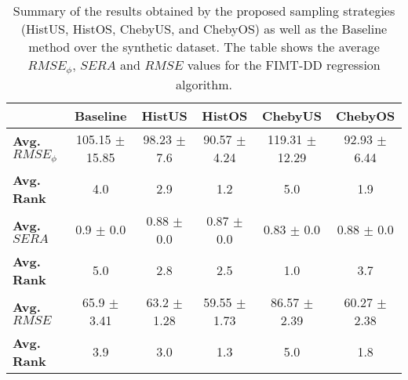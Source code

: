 \begin{table}[!htb]
\caption{Summary of the results obtained by the proposed sampling strategies (HistUS, HistOS, ChebyUS, and
ChebyOS) as well as the Baseline method over the synthetic dataset. The table shows the average
$RMSE_{\phi}$, $SERA$ and $RMSE$ values for the FIMT-DD regression algorithm.}
\label{tab:result_phi_sera_synthetic}
\begin{tabular*}{\textwidth}{@{\extracolsep{\fill}}lccccc}
\toprule
 & Baseline & HistUS & HistOS & ChebyUS & ChebyOS \\
\midrule
{\bf Avg. $RMSE_{\phi}$} & 105.15 $\pm$ 15.85 & 98.23 $\pm$ 7.6 & 90.57 $\pm$ 4.24 & 119.31 $\pm$ 12.29 & 92.93 $\pm$ 6.44 \\
{\bf Avg. Rank} & 4.0 & 2.9 & 1.2 & 5.0 & 1.9 \\
\midrule
{\bf Avg. $SERA$} & 0.9 $\pm$ 0.0 & 0.88 $\pm$ 0.0 & 0.87 $\pm$ 0.0 & 0.83 $\pm$ 0.0 & 0.88 $\pm$ 0.0 \\
{\bf Avg. Rank} & 5.0 & 2.8 & 2.5 & 1.0 & 3.7 \\
\midrule
{\bf Avg. $RMSE$} & 65.9 $\pm$ 3.41 & 63.2 $\pm$ 1.28 & 59.55 $\pm$ 1.73 & 86.57 $\pm$ 2.39 & 60.27 $\pm$ 2.38 \\
{\bf Avg. Rank} & 3.9 & 3.0 & 1.3 & 5.0 & 1.8 \\
\bottomrule
\end{tabular*}
\end{table}